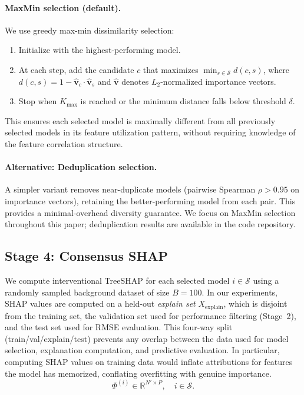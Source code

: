 \documentclass[11pt]{article}
\newcommand{\rhovar}{\rho}
\begin{document}
\paragraph{MaxMin selection (default).}
We use greedy max-min dissimilarity selection:
\begin{enumerate}
  \item Initialize with the highest-performing model.
  \item At each step, add the candidate $c$ that maximizes
    $\min_{s \in \mathcal{S}} d(c, s)$, where
    $d(c, s) = 1 - \hat{\mathbf{v}}_c \cdot \hat{\mathbf{v}}_s$
    and $\hat{\mathbf{v}}$ denotes $L_2$-normalized importance vectors.
  \item Stop when $K_{\max}$ is reached or the minimum distance falls
    below threshold $\delta$.
\end{enumerate}

This ensures each selected model is maximally different from all previously
selected models in its feature utilization pattern, without requiring
knowledge of the feature correlation structure.

\paragraph{Alternative: Deduplication selection.}
A simpler variant removes near-duplicate models (pairwise Spearman
$\rhovar > 0.95$ on importance vectors), retaining the better-performing
model from each pair. This provides a minimal-overhead diversity guarantee.
We focus on MaxMin selection throughout this paper; deduplication results
are available in the code repository.

\subsection{Stage 4: Consensus SHAP}

We compute interventional TreeSHAP \citep{lundberg2020local} for each
selected model $i \in \mathcal{S}$ using a randomly sampled background
dataset of size $B = 100$. In our experiments, SHAP values are computed
on a held-out \emph{explain set} $X_{\text{explain}}$, which is disjoint
from the training set, the validation set used for performance filtering
(Stage~2), and the test set used for RMSE evaluation. This four-way split
(train/val/explain/test) prevents any overlap between the data used for
model selection, explanation computation, and predictive evaluation.
In particular, computing SHAP values on training data would inflate
attributions for features the model has memorized, conflating
overfitting with genuine importance.
\begin{equation}
  \Phi^{(i)} \in \mathbb{R}^{N' \times P}, \quad i \in \mathcal{S}.
\end{equation}
\end{document}
